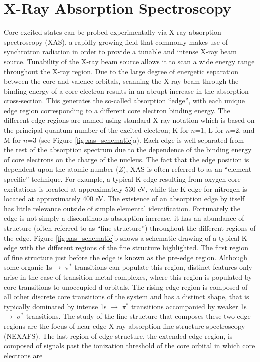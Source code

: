 \documentclass{article}
\begin{document}
\section{X-Ray Absorption Spectroscopy}
Core-excited states can be probed experimentally via X-ray absorption spectroscopy (XAS), a rapidly growing field that commonly makes use of synchrotron radiation in order to provide a tunable and intense X-ray beam source.\cite{snigirev_compound_1996,holch_new_2011} Tunability of the X-ray beam source allows it to scan a wide energy range throughout the X-ray region. Due to the large degree of energetic separation between the core and valence orbitals,\cite{politzer_separation_1976} scanning the X-ray beam through the binding energy of a core electron results in an abrupt increase in the absorption cross-section. This generates the so-called absorption ``edge'', with each unique edge region corresponding to a different core electron binding energy.\cite{stohr_nexafs_1992} The different edge regions are named using standard X-ray notation which is based on the principal quantum number of the excited electron; K for $n$=1, L for $n$=2, and M for $n$=3 (see Figure \ref{fig:xas_schematic}a).\cite{penner-hahn_x-ray_1999} Each edge is well separated from the rest of the absorption spectrum due to the dependence of the binding energy of core electrons on the charge of the nucleus. The fact that the edge position is dependent upon the atomic number ($Z$), XAS is often referred to as an ``element specific'' technique. For example, a typical K-edge resulting from oxygen core excitations is located at approximately 530 eV,\cite{yoon_oxygen_2002,parent_structure_2002} while the K-edge for nitrogen is located at approximately 400 eV.\cite{lambrecht_x-ray_1997,leinweber_nitrogen_2007} The existence of an absorption edge by itself has little relevance outside of simple elemental identification.\cite{cotte_synchrotron-based_2010} Fortunately the edge is not simply a discontinuous absorption increase, it has an abundance of structure (often referred to as ``fine structure'') throughout the different regions of the edge. Figure \ref{fig:xas_schematic}b shows a schematic drawing of a typical K-edge with the different regions of the fine structure highlighted. The first region of fine structure just before the edge is known as the pre-edge region. Although some organic 1s$\rightarrow$ $\pi^*$ transitions can populate this region, distinct features only arise in the case of transition metal complexes, where this region is populated by core transitions to unoccupied d-orbitals.\cite{yamamoto_assignment_2008,vedrinskii_pre-edge_1998,groot_1s_2009,roemelt_manganese_2012} The rising-edge region is composed of all other discrete core transitions of the system and has a distinct shape, that is typically dominated by intense 1s $\rightarrow$ $\pi^*$ transitions accompanied by weaker 1s $\rightarrow$ $\sigma^*$ transitions. The study of the fine structure that composes these two edge regions are the focus of near-edge X-ray absorption fine structure spectroscopy (NEXAFS).\cite{stohr_nexafs_1992} The last region of edge structure, the extended-edge region, is composed of signals past the ionization threshold of the core orbital in which core electrons are 
\end{document}
